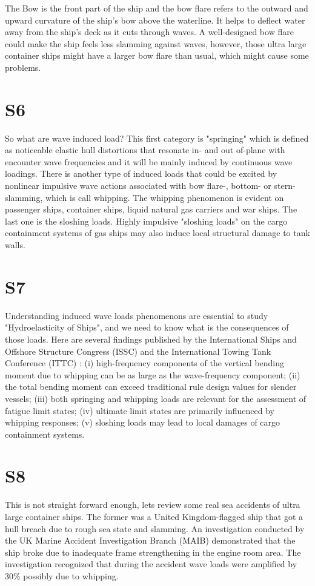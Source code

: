 \documentclass[17pt]{extarticle} %
\begin{document}
The Bow is the front part of the ship and the bow flare refers to the outward and upward curvature of the ship's bow above the waterline. It helps to deflect water 
away from the ship’s deck as it cuts through waves. A well-designed bow flare could make the ship feels less slamming against waves, however, those ultra large container ships might 
have a larger bow flare than usual, which might cause some problems.

\section*{S6}
So what are wave induced load? This first category is "springing" which is defined as 
noticeable elastic hull distortions that resonate in- and out of-plane with encounter wave frequencies and it will be mainly induced by continuous wave loadings.
There is another type of induced loads that could be excited 
by nonlinear impulsive wave actions associated with bow flare-, bottom- or stern-slamming, which is call whipping. The whipping phenomenon is evident on passenger ships, 
container ships, liquid natural gas carriers and war ships. The last one is the sloshing loads. Highly impulsive "sloshing loads" on the cargo containment systems of gas 
ships may also induce local structural damage to tank walls. 

\section*{S7}
Understanding induced wave loads phenomenons are essential to study "Hydroelasticity of Ships", and we need to know  what is the consequences of 
those loads. Here are several findings 
published by the International Ships and Offshore Structure Congress (ISSC) and the International Towing Tank Conference (ITTC) 
: (i) high-frequency components of the vertical bending moment due to whipping 
can be as large as the wave-frequency component; (ii) the total bending moment can exceed traditional rule design values for 
slender vessels; (iii) both springing and whipping loads are relevant for the assessment of fatigue limit states; (iv) ultimate 
limit states are primarily influenced by whipping responses; (v) sloshing loads may lead to local damages of cargo containment 
systems. 

\section*{S8}
This is not straight forward enough, lets review some real sea accidents of ultra large container ships. The former was a United Kingdom-flagged ship that got a 
hull breach due to rough sea state and slamming. An investigation conducted by the UK Marine Accident Investigation Branch (MAIB)
demonstrated that the ship broke due to inadequate frame strengthening in the engine room area. The investigation recognized that during the accident wave loads 
were amplified by 30\% possibly due to whipping.
\end{document}
